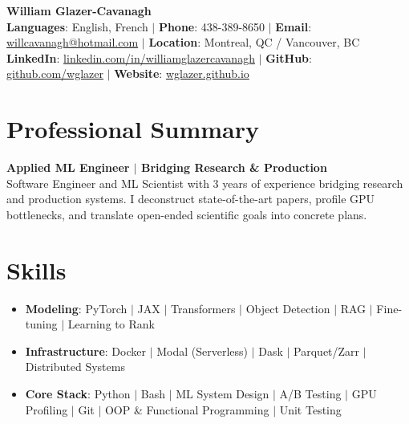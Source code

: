 \documentclass[letterpaper,10pt]{article}
\newcommand{\resumeItem}[1]{\item\small{#1}}
\begin{document}
\begin{center}
  \textbf{\Huge William Glazer-Cavanagh} \\
  \vspace{5pt}
  \small
  \textbf{Languages}: English, French $|$ \textbf{Phone}: 438-389-8650 $|$ \textbf{Email}: \href{mailto:willcavanagh@hotmail.com}{willcavanagh@hotmail.com} $|$ \textbf{Location}: Montreal, QC / Vancouver, BC \\
  \textbf{LinkedIn}: \href{https://www.linkedin.com/in/williamglazercavanagh/}{linkedin.com/in/williamglazercavanagh} $|$ \textbf{GitHub}: \href{https://github.com/wglazer}{github.com/wglazer} $|$ \textbf{Website}: \href{https://wglazer.github.io}{wglazer.github.io}
\end{center}

\vspace{-10pt}

\section{Professional Summary}
\vspace{-4pt}
\textbf{Applied ML Engineer $|$ Bridging Research \& Production} \\
\vspace{2pt}
{\small Software Engineer and ML Scientist with 3 years of experience bridging research and production systems. I deconstruct state-of-the-art papers, profile GPU bottlenecks, and translate open-ended scientific goals into concrete plans.}

\vspace{-6pt}

\section{Skills}
\vspace{-4pt}
\begin{itemize}[leftmargin=0in, label={}, itemsep=-2pt]
  \resumeItem{\textbf{Modeling}: PyTorch $|$ JAX $|$ Transformers $|$ Object Detection $|$ RAG $|$ Fine-tuning $|$ Learning to Rank}
  \resumeItem{\textbf{Infrastructure}: Docker $|$ Modal (Serverless) $|$ Dask $|$ Parquet/Zarr $|$ Distributed Systems}
  \resumeItem{\textbf{Core Stack}: Python $|$ Bash $|$ ML System Design $|$ A/B Testing $|$ GPU Profiling $|$ Git $|$ OOP \& Functional Programming $|$ Unit Testing}
\end{itemize}
\end{document}
